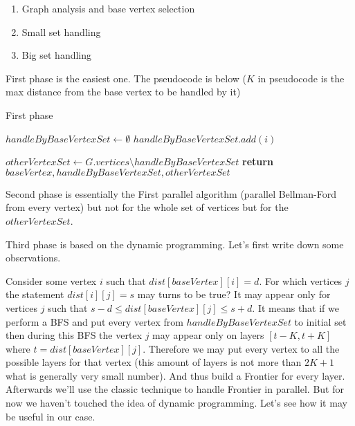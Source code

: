 \begin{enumerate}
  \item Graph analysis and base vertex selection 
  \item Small set handling
  \item Big set handling
\end{enumerate}

First phase is the easiest one. The pseudocode is below ($K$ in pseudocode is the max distance from the base vertex to be handled by it)

\FloatBarrier
\begin{algorithm}
\caption{First phase}\label{all_pairs_social1}
\begin{algorithmic}[1]
\State $handleByBaseVertexSet \gets \emptyset$
\algrenewcommand{} 
\algrenewcommand{}
		\State $handleByBaseVertexSet.add(i)$
	\EndIf
\EndFor

\State $otherVertexSet \gets G.vertices \setminus handleByBaseVertexSet$ 
\State \textbf{return} $ baseVertex, handleByBaseVertexSet, otherVertexSet$
\EndProcedure

\end{algorithmic}
\end{algorithm}

Second phase is essentially the First parallel algorithm (parallel Bellman-Ford from every vertex) but not for the whole set of vertices but for the $otherVertexSet$.

Third phase is based on the dynamic programming. Let's first write down some observations. 

Consider some vertex $i$ such that $dist[baseVertex][i] = d$. For which vertices $j$ the statement $dist[i][j] = s$ may turns to be true? It may appear only for vertices $j$ such that $s - d \leq dist[baseVertex][j] \leq s + d$. It means that if we perform a BFS and put every vertex from $handleByBaseVertexSet$ to initial set then during this BFS the vertex $j$ may appear only on layers $[t-K, t+K]$ where $t = dist[baseVertex][j] $. Therefore we may put every vertex to all the possible layers for that vertex (this amount of layers is not more than $2K+1$ what is generally very small number). And thus build a Frontier for every layer. Afterwards we'll use the classic technique to handle Frontier in parallel. But for now we haven't touched the idea of dynamic programming. Let's see how it may be useful in our case. 

